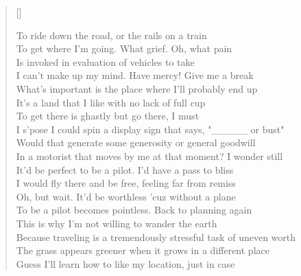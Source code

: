 \documentclass[a5paper,10pt,twoside]{memoir}
\begin{document}
\settowidth{\versewidth}{Because traveling is a tremendously stressful task of uneven worth}
\PlainPoemTitle %
{}
\begin{verse}[\versewidth]

To ride down the road, or the rails on a train\\
To get where I'm going. What grief. Oh, what pain\\
Is invoked in evaluation of vehicles to take\\
I can't make up my mind. Have mercy! Give me a break\\
What's important is the place where I'll probably end up\\
It's a land that I like with no lack of full cup\\
To get there is ghastly but go there, I must\\
I s'pose I could spin a display sign that says, "_____ or bust"\\
Would that generate some generosity or general goodwill\\
In a motorist that moves by me at that moment? I wonder still\\
It'd be perfect to be a pilot. I'd have a pass to bliss\\
I would fly there and be free, feeling far from remiss\\
Oh, but wait. It'd be worthless 'cuz without a plane\\
To be a pilot becomes pointless. Back to planning again\\
This is why I'm not willing to wander the earth\\
Because traveling is a tremendously stressful task of uneven worth\\
The grass appears greener when it grows in a different place\\
Guess I'll learn how to like my location, just in case\\
\end{verse}
\end{document}
